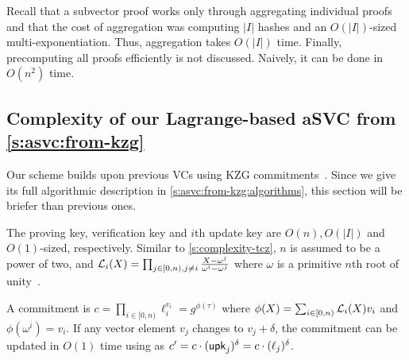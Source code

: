 Recall that a subvector proof works only through aggregating individual proofs and that the cost of aggregation was computing $|I|$ hashes and an $O(|I|)$-sized multi-exponentiation.
Thus, aggregation takes $O(|I|)$ time.
Finally, precomputing all proofs efficiently is not discussed.
Naively, it can be done in $O(n^2)$ time.

\subsection{Complexity of our Lagrange-based aSVC from \cref{s:asvc:from-kzg}}
\label{s:complexity-lagrange-asvc}
Our scheme builds upon previous VCs using KZG commitments~\cite{CDHK15, KZG10a}.
Since we give its full algorithmic description in \cref{s:asvc:from-kzg:algorithms}, this section will be briefer than previous ones.

The proving key, verification key and $i$th update key are $O(n), O(|I|)$ and $O(1)$-sized, respectively.
Similar to \cref{s:complexity-tcz}, $n$ is assumed to be a power of two, and $\mathcal{L}_i(X)=\prod_{j\in [0,n),j\ne i} \frac{X-\omega^j}{\omega^i - \omega^j}$ where $\omega$ is a primitive $n$th root of unity~\cite{vG13ModernCh8}.

A commitment is $c=\prod_{i\in[0,n)} \ell_i^{v_i}=g^{\phi(\tau)}$ where $\phi(X)=\sum_{i\in [0,n)} \mathcal{L}_i(X) v_i$ and $\phi(\omega^i) = v_i$.
If any vector element $v_j$ changes to $v_j + \delta$, the commitment can be updated in $O(1)$ time using as $c' = c \cdot (\mathsf{upk}_j)^{\delta} = c\cdot (\ell_j)^{\delta}$.

